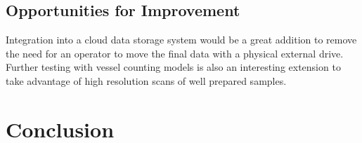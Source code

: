 \documentclass[a4paper,12pt]{article}
\begin{document}
\subsection{Opportunities for Improvement}
Integration into a cloud data storage system would be a great addition to remove the need for an operator to move the final data with a physical external drive. 
Further testing with vessel counting models is also an interesting extension to take advantage of high resolution scans of well prepared samples. 

\section{Conclusion}



\end{document}
